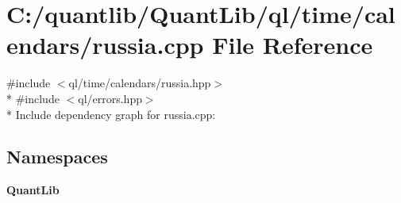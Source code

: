 \section{C\+:/quantlib/\+Quant\+Lib/ql/time/calendars/russia.cpp File Reference}
\label{russia_8cpp}
{\ttfamily \#include $<$ql/time/calendars/russia.\+hpp$>$}\\*
{\ttfamily \#include $<$ql/errors.\+hpp$>$}\\*
Include dependency graph for russia.\+cpp\+:
\subsection*{Namespaces}
\begin{DoxyCompactItemize}
\item 
 {\bf Quant\+Lib}
\end{DoxyCompactItemize}
